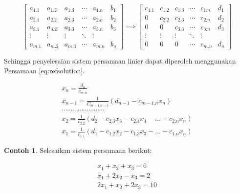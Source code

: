 \documentclass[
]{book}
\theoremstyle{definition}
\theoremstyle{definition}
\newtheorem{example}{Contoh}[chapter]
\theoremstyle{definition}
\theoremstyle{definition}
\theoremstyle{remark}
\begin{document}
\begin{equation}
\begin{bmatrix}
     a_{1.1} & a_{1.2} & a_{1.3} &\cdots& a_{1.n} & b_1     \\[0.3em]
     a_{2.1} & a_{2.2} & a_{2.3} &\cdots& a_{2.n} & b_2     \\[0.3em]
     a_{3.1} & a_{3.2} & a_{3.3} &\cdots& a_{3.n} & b_3     \\[0.3em]
     \vdots  & \vdots  & \vdots &\ddots& \vdots             \\[0.3em]
     a_{m.1} & a_{m.2} & a_{m.3} &\cdots& a_{m.n} & b_n
     \end{bmatrix}
\implies
\begin{bmatrix}
     c_{1.1} & c_{1.2} & c_{1.3} &\cdots& c_{1.n} & d_1     \\[0.3em]
     0       & c_{2.2} & c_{2.3} &\cdots& c_{2.n} & d_2     \\[0.3em]
     0       & 0       & c_{3.3} &\cdots& c_{3.n} & d_3     \\[0.3em]
     \vdots  & \vdots  & \vdots &\ddots& \vdots             \\[0.3em]
     0       & 0       & 0      &\cdots& c_{m.n} & d_n
     \end{bmatrix}
  \label{eq:refeq}
\end{equation}

Sehingga penyelesaian sistem persamaan linier dapat diperoleh menggunakan Persamaan \eqref{eq:refsolution}.

\begin{equation}
\begin{matrix}
  x_n=\frac{d_n}{c_{m.n}} \\
  x_{n-1}=\frac{1}{C_{m-1.n-1}}\left(d_{n-1}-c_{m-1.n}x_n\right) \\
  \cdots\cdots\cdots\cdots\cdots\cdots\cdots\cdots       \\
  x_2=\frac{1}{c_{2.2}}\left(d_2-c_{2.3}x_3-c_{2.4}x_4-\dots-c_{2.n}x_n\right) \\
  x_1=\frac{1}{c_{1.1}}\left(d_1-c_{1.2}x_2-c_{1.3}x_3-\dots-c_{1.n}x_n\right)
   \end{matrix}
  \label{eq:refsolution}
\end{equation}

\begin{example}
\protect\hypertarget{exm:refexm}{}\label{exm:refexm}Selesaikan sistem persamaan berikut:
\end{example}

\[
\begin{matrix}
  x_1+x_2+x_3=6 \\
  x_1+2x_2-x_3=2 \\
  2x_1+x_2+2x_3=10 \\
\end{matrix}
\]
\end{document}
